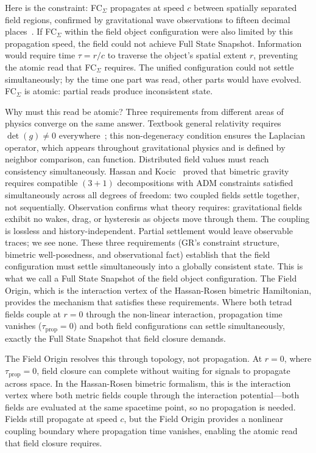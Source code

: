 \documentclass[aps,prd,preprint,superscriptaddress,showpacs,preprintnumbers,amsmath,amssymb,nofootinbib]{revtex4-2}
\begin{document}
Here is the constraint: FC$_{\Sigma}$ propagates at speed $c$ between spatially separated field regions, confirmed by gravitational wave observations to fifteen decimal places~\cite{gw170817}. If FC$_{\Sigma}$ within the field object configuration were also limited by this propagation speed, the field could not achieve Full State Snapshot. Information would require time $\tau = r/c$ to traverse the object's spatial extent $r$, preventing the atomic read that FC$_{\Sigma}$ requires. The unified configuration could not settle simultaneously; by the time one part was read, other parts would have evolved. FC$_{\Sigma}$ is atomic: partial reads produce inconsistent state.

Why must this read be atomic? Three requirements from different areas of physics converge on the same answer. Textbook general relativity requires $\det(g) \neq 0$ everywhere~\cite{mtw1973,wald1984}; this non-degeneracy condition ensures the Laplacian operator, which appears throughout gravitational physics and is defined by neighbor comparison, can function. Distributed field values must reach consistency simultaneously. Hassan and Kocic~\cite{hassankocic2018} proved that bimetric gravity requires compatible $(3{+}1)$ decompositions with ADM constraints satisfied simultaneously across all degrees of freedom: two coupled fields settle together, not sequentially. Observation confirms what theory requires: gravitational fields exhibit no wakes, drag, or hysteresis as objects move through them. The coupling is lossless and history-independent. Partial settlement would leave observable traces; we see none. These three requirements (GR's constraint structure, bimetric well-posedness, and observational fact) establish that the field configuration must settle simultaneously into a globally consistent state. This is what we call a Full State Snapshot of the field object configuration. The Field Origin, which is the interaction vertex of the Hassan-Rosen bimetric Hamiltonian, provides the mechanism that satisfies these requirements. Where both tetrad fields couple at $r = 0$ through the non-linear interaction, propagation time vanishes ($\tau_{\text{prop}} = 0$) and both field configurations can settle simultaneously, exactly the Full State Snapshot that field closure demands.

The Field Origin resolves this through topology, not propagation. At $r = 0$, where $\tau_{\text{prop}} = 0$, field closure can complete without waiting for signals to propagate across space. In the Hassan-Rosen bimetric formalism, this is the interaction vertex where both metric fields couple through the interaction potential—both fields are evaluated at the same spacetime point, so no propagation is needed. Fields still propagate at speed $c$, but the Field Origin provides a nonlinear coupling boundary where propagation time vanishes, enabling the atomic read that field closure requires.
\end{document}
